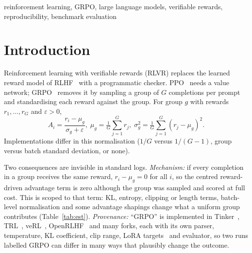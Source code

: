 \documentclass[conference]{IEEEtran}
\begin{document}
\begin{IEEEkeywords}
reinforcement learning, GRPO, large language models, verifiable rewards,
reproducibility, benchmark evaluation
\end{IEEEkeywords}

\section{Introduction}

Reinforcement learning with verifiable rewards (RLVR) replaces the learned
reward model of RLHF~\cite{ouyang2022training} with a programmatic checker.
PPO~\cite{schulman2017proximal} needs a value network;
GRPO~\cite{shao2024deepseekmath,guo2025deepseekr1} removes it by sampling a
group of $G$ completions per prompt and standardising each reward against
the group. For group $g$ with rewards $r_1,\dots,r_G$ and $\varepsilon>0$,
\begin{equation}
A_i = \frac{r_i - \mu_g}{\sigma_g + \varepsilon}, \;
\mu_g = \tfrac{1}{G}\textstyle\sum_{j=1}^{G} r_j, \;
\sigma_g^2 = \tfrac{1}{G}\textstyle\sum_{j=1}^{G} (r_j-\mu_g)^2 .
\label{eq:adv}
\end{equation}
Implementations differ in this normalisation ($1/G$ versus $1/(G-1)$, group
versus batch standard deviation, or none).

Two consequences are invisible in standard logs. \emph{Mechanism:} if every
completion in a group receives the same reward, $r_i-\mu_g=0$ for all $i$,
so the centred reward-driven advantage term is zero although the group was
sampled and scored at full cost. This is scoped to that term: KL, entropy,
clipping or length terms, batch-level normalisation and some advantage
shapings change what a uniform group contributes (Table~\ref{tab:est}).
\emph{Provenance:} ``GRPO'' is implemented in
Tinker~\cite{thinkingmachines2024tinker}, TRL~\cite{vonwerra2022trl},
veRL~\cite{sheng2024verl}, OpenRLHF~\cite{hu2024openrlhf} and many forks,
each with its own parser, temperature, KL coefficient, clip range, LoRA
targets~\cite{hu2022lora} and evaluator, so two runs labelled GRPO can
differ in many ways that plausibly change the outcome.
\end{document}
